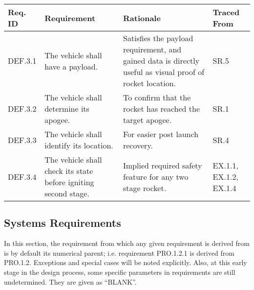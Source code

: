 \begin{table}[htbp]
    \centering
    \footnotesize 
    \setlength{\tymin}{40pt}
    \let\raggedright\RaggedRight
    
    \begin{tabulary}{\textwidth}{@{}LLLL@{}}
    \toprule
        \textbf{Req. ID} & \textbf{Requirement} & \textbf{Rationale} & \textbf{Traced From} \\
    \midrule
        DEF.3.1 & The vehicle shall have a payload. & Satisfies the payload requirement, and gained data is directly useful as visual proof of rocket location. & SR.5 \\
        DEF.3.2 & The vehicle shall determine its apogee. & To confirm that the rocket has reached the target apogee. & SR.1 \\ 
        DEF.3.3 & The vehicle shall identify its location. & For easier post launch recovery.
        & SR.4 \\
        DEF.3.4 & The vehicle shall check its state before igniting second stage. & Implied required safety feature for any two stage rocket. & EX.1.1, EX.1.2, EX.1.4 \\
    \bottomrule
    \end{tabulary}

    \label{table:func-3}
\end{table}


\subsection{Systems Requirements}
In this section, the requirement from which any given requirement is derived from is by default its numerical parent; i.e. requirement PRO.1.2.1 is derived from PRO.1.2. Exceptions and special cases will be noted explicitly. Also, at this early stage in the design process, some specific parameters in requirements are still undetermined. They are given as ``BLANK''.

